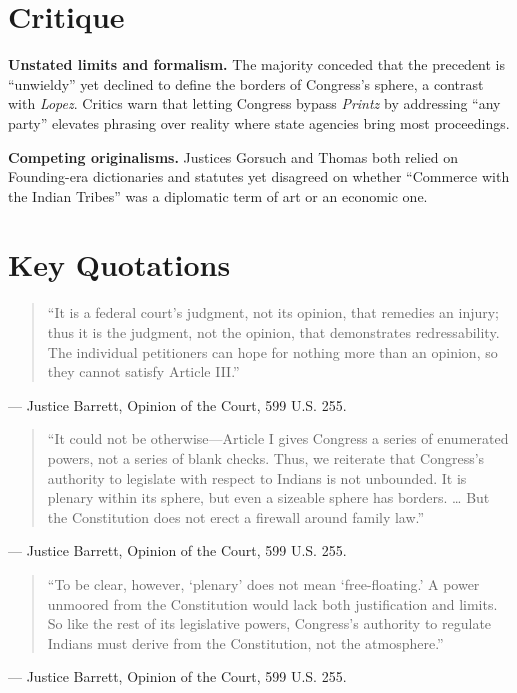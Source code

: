 \documentclass[12pt]{article}
\begin{document}
\section{Critique}

\textbf{Unstated limits and formalism.} The majority conceded that the precedent is ``unwieldy'' yet declined to define the borders of Congress's sphere, a contrast with \textit{Lopez}. Critics warn that letting Congress bypass \textit{Printz} by addressing ``any party'' elevates phrasing over reality where state agencies bring most proceedings.

\textbf{Competing originalisms.} Justices Gorsuch and Thomas both relied on Founding-era dictionaries and statutes yet disagreed on whether ``Commerce with the Indian Tribes'' was a diplomatic term of art or an economic one.

\section{Key Quotations}

\begin{quote}
``It is a federal court's judgment, not its opinion, that remedies an injury; thus it is the judgment, not the opinion, that demonstrates redressability. The individual petitioners can hope for nothing more than an opinion, so they cannot satisfy Article III.''
\end{quote}
\noindent --- Justice Barrett, Opinion of the Court, 599 U.S. 255.

\begin{quote}
``It could not be otherwise---Article I gives Congress a series of enumerated powers, not a series of blank checks. Thus, we reiterate that Congress's authority to legislate with respect to Indians is not unbounded. It is plenary within its sphere, but even a sizeable sphere has borders. \ldots{} But the Constitution does not erect a firewall around family law.''
\end{quote}
\noindent --- Justice Barrett, Opinion of the Court, 599 U.S. 255.

\begin{quote}
``To be clear, however, `plenary' does not mean `free-floating.' A power unmoored from the Constitution would lack both justification and limits. So like the rest of its legislative powers, Congress's authority to regulate Indians must derive from the Constitution, not the atmosphere.''
\end{quote}
\noindent --- Justice Barrett, Opinion of the Court, 599 U.S. 255.
\end{document}
